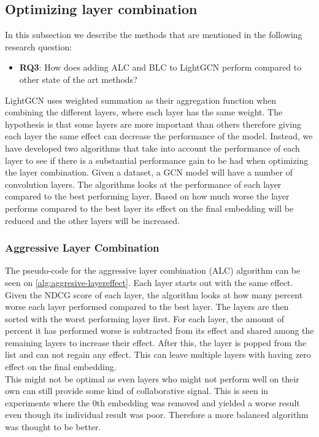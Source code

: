 \subsection{Optimizing layer combination}\label{fredsplit}
In this subsection we describe the methods that are mentioned in the following research question:
\begin{itemize}
    \item \textbf{RQ3}: How does adding ALC and BLC to LightGCN perform compared to other state of the art methods?
\end{itemize}  
LightGCN uses weighted summation as their aggregation function when combining the different layers, where each layer has the same weight.
The hypothesis is that some layers are more important than others therefore giving each layer the same effect can decrease the performance of the model.
Instead, we have developed two algorithms that take into account the performance of each layer to see if there is a substantial performance gain to be had when optimizing the layer combination.
Given a dataset, a GCN model will have a number of convolution layers.
The algorithms looks at the performance of each layer compared to the best performing layer.
Based on how much worse the layer performs compared to the best layer its effect on the final embedding will be reduced and the other layers will be increased.

\subsubsection{Aggressive Layer Combination}
The pseudo-code for the aggressive layer combination (ALC) algorithm can be seen on \autoref{alg:aggresive-layereffect}.
Each layer starts out with the same effect.
Given the NDCG score of each layer, the algorithm looks at how many percent worse each layer performed compared to the best layer.
The layers are then sorted with the worst performing layer first.
For each layer, the amount of percent it has performed worse is subtracted from its effect and shared among the remaining layers to increase their effect.
After this, the layer is popped from the list and can not regain any effect.
This can leave multiple layers with having zero effect on the final embedding.
\\
This might not be optimal as even layers who might not perform well on their own can still provide some kind of collaborative signal.
This is seen in experiments where the 0th embedding was removed and yielded a worse result even though its individual result was poor.
Therefore a more balanced algorithm was thought to be better.

